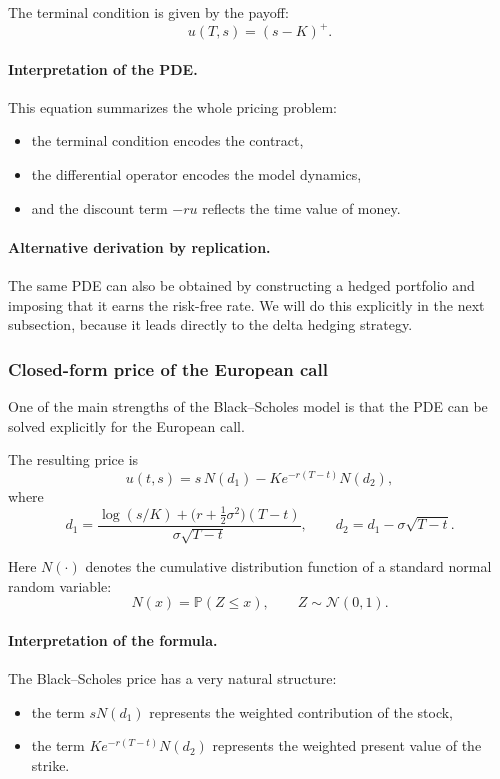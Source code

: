 \documentclass[11pt]{article}
\theoremstyle{plain}
\theoremstyle{definition}
\theoremstyle{remark}
\begin{document}
The terminal condition is given by the payoff:
\[
\boxed{
u(T,s)=(s-K)^+.
}
\]

\paragraph{Interpretation of the PDE.}
This equation summarizes the whole pricing problem:
\begin{itemize}[leftmargin=1.4em]
    \item the terminal condition encodes the contract,
    \item the differential operator encodes the model dynamics,
    \item and the discount term \(-ru\) reflects the time value of money.
\end{itemize}

\paragraph{Alternative derivation by replication.}
The same PDE can also be obtained by constructing a hedged portfolio and
imposing that it earns the risk-free rate.
We will do this explicitly in the next subsection, because it leads
directly to the delta hedging strategy.

\subsubsection{Closed-form price of the European call}

One of the main strengths of the Black--Scholes model is that the PDE
can be solved explicitly for the European call.

The resulting price is
\[
\boxed{
u(t,s)=s\,N(d_1)-Ke^{-r(T-t)}N(d_2),
}
\]
where
\[
d_1
=
\frac{\log(s/K)+\big(r+\tfrac12\sigma^2\big)(T-t)}
{\sigma\sqrt{T-t}},
\qquad
d_2=d_1-\sigma\sqrt{T-t}.
\]

Here \(N(\cdot)\) denotes the cumulative distribution function of a
standard normal random variable:
\[
N(x)=\mathbb{P}(Z\le x),
\qquad
Z\sim\mathcal N(0,1).
\]

\paragraph{Interpretation of the formula.}
The Black--Scholes price has a very natural structure:
\begin{itemize}[leftmargin=1.4em]
    \item the term \(sN(d_1)\) represents the weighted contribution of
    the stock,
    \item the term \(Ke^{-r(T-t)}N(d_2)\) represents the weighted present
    value of the strike.
\end{itemize}
\end{document}
